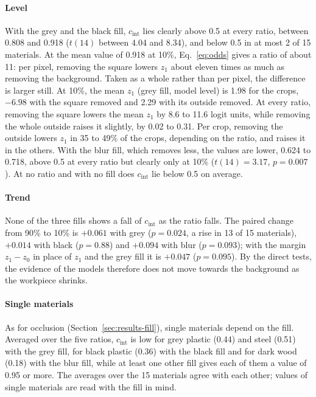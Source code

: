 \paragraph{Level}
With the grey and the black fill, $c_{\mathrm{int}}$ lies clearly above 0.5 at every
ratio, between 0.808 and 0.918 ($t(14)$ between 4.04 and 8.34), and below 0.5 in at most
2 of 15 materials. At the mean value of 0.918 at 10\%, Eq.~\eqref{eq:odds} gives a ratio of about 11:
per pixel, removing the square lowers $z_1$ about eleven times as much as removing the
background. Taken as a whole rather than per pixel, the difference is larger still. At
10\%, the mean $z_1$ (grey fill, model level) is 1.98 for the crops, $-6.98$ with the
square removed and 2.29 with its outside removed. At every ratio, removing the square
lowers the mean $z_1$ by 8.6 to 11.6 logit units, while removing the whole outside
raises it slightly, by 0.02 to 0.31. Per crop, removing the outside lowers $z_1$ in 35
to 49\% of the crops, depending on the ratio, and raises it in the others. With the blur fill, which removes less, the values are lower, 0.624 to
0.718, above 0.5 at every ratio but clearly only at 10\% ($t(14) = 3.17$, $p = 0.007$).
At no ratio and with no fill does $c_{\mathrm{int}}$ lie below 0.5 on average.

\paragraph{Trend}
None of the three fills shows a fall of $c_{\mathrm{int}}$ as the ratio falls. The
paired change from 90\% to 10\% is $+0.061$ with grey ($p = 0.024$, a rise in 13 of 15
materials), $+0.014$ with black ($p = 0.88$) and $+0.094$ with blur ($p = 0.093$); with the
margin $z_1 - z_0$ in place of $z_1$ and the grey fill it is $+0.047$ ($p = 0.095$). By
the direct tests, the evidence of the models therefore does not move towards the
background as the workpiece shrinks.

\paragraph{Single materials}
As for occlusion (Section~\ref{sec:results-fill}), single materials depend on the
fill. Averaged over the five ratios, $c_{\mathrm{int}}$ is low for grey plastic (0.44)
and steel (0.51) with the grey fill, for black plastic (0.36) with the black fill and
for dark wood (0.18) with the blur fill, while at least one other fill gives each of
them a value of 0.95 or more. The averages over the 15 materials agree with each
other; values of single materials are read with the fill in mind.

